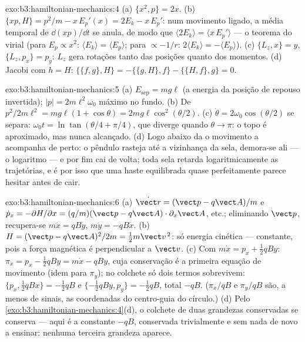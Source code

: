 \begin{solution}{exo:b3:hamiltonian-mechanics:4}
(a) $\{x^2, p\} = 2x$. (b) $\{xp, H\} = p^2/m - x\,E_p'(x) = 2E_k -
x\,E_p'$: num movimento ligado, a média temporal de $\dd(xp)/\dd t$ se
anula, de modo que $\langle 2E_k\rangle = \langle x\,E_p'\rangle$ --- o
teorema do virial (para $E_p \propto x^2$: $\langle E_k\rangle = \langle
E_p\rangle$; para $\propto -1/r$: $2\langle E_k\rangle = -\langle
E_p\rangle$). (c) $\{L_z, x\} = y$, $\{L_z, p_x\} = p_y$: $L_z$ gera
rotações tanto das posições quanto dos momentos. (d) Jacobi com $h
= H$: $\{\{f, g\}, H\} = -\{\{g, H\}, f\} - \{\{H, f\}, g\} = 0$.
\end{solution}

\begin{solution}{exo:b3:hamiltonian-mechanics:5}
(a) $E_{\text{sep}} = mg\ell$ (a energia da posição de repouso
invertida); $|p| = 2m\ell^2\omega_0$ máximo no fundo. (b) De
$p^2/2m\ell^2 = mg\ell(1 + \cos\theta) = 2mg\ell\cos^2(\theta/2)$. (c)
$\dot\theta = 2\omega_0\cos(\theta/2)$ se separa: $\omega_0t =
\ln\tan(\theta/4 + \pi/4)$, que diverge quando $\theta \to \pi$: o
topo é aproximado, mas nunca alcançado. (d) Logo abaixo da  o
movimento a acompanha de perto: o pêndulo rasteja até a vizinhança da
sela, demora-se ali --- o logaritmo --- e por fim cai de volta; toda
sela retarda logaritmicamente as trajetórias, e é por isso que uma
haste equilibrada quase perfeitamente parece hesitar antes de cair.
\end{solution}

\begin{solution}{exo:b3:hamiltonian-mechanics:6}
(a) $\dot{\vect r} = (\vect p - q\vect A)/m$ e $\dot p_x =
-\partial H/\partial x = (q/m)(\vect p - q\vect A)\cdot\partial_x\vect
A$, etc.; eliminando $\vect p$, recupera-se $m\ddot x = qB\dot y$,
$m\ddot y = -qB\dot x$. (b) $H = (\vect p - q\vect A)^2/2m = \tfrac12
m\vect v^{\,2}$: só energia cinética --- constante, pois a força
magnética é perpendicular a $\vect v$. (c) Com $m\dot x = p_x +
\tfrac12 qBy$: $\pi_x = p_x - \tfrac12 qBy = m\dot x - qBy$, cuja
conservação é a primeira equação de movimento (idem para $\pi_y$); no
colchete só dois termos sobrevivem: $\{p_x, \tfrac12 qBx\} = -\tfrac12
qB$ e $\{-\tfrac12 qBy, p_y\} = -\tfrac12 qB$, total $-qB$. ($\pi_x/qB$ e $\pi_y/qB$
são, a menos de sinais, as coordenadas do centro-guia do
círculo.) (d) Pelo \cref{exo:b3:hamiltonian-mechanics:4}(d), o colchete
de duas grandezas conservadas se conserva --- aqui é a constante
$-qB$, conservada trivialmente e sem nada de novo a ensinar: nenhuma
terceira grandeza aparece.
\end{solution}


